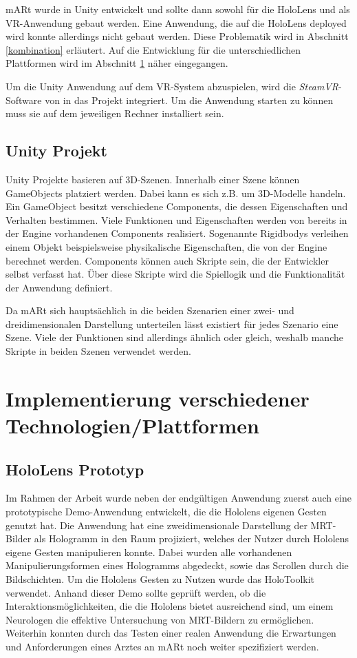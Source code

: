 mARt wurde in Unity entwickelt und sollte dann sowohl für die HoloLens und als VR-Anwendung gebaut werden. Eine Anwendung, die auf die HoloLens deployed wird konnte allerdings nicht gebaut werden. Diese Problematik wird in Abschnitt \ref{kombination} erläutert. Auf die Entwicklung für die unterschiedlichen Plattformen wird im Abschnitt \ref{plattformen} näher eingegangen.

Um die Unity Anwendung auf dem VR-System abzuspielen, wird die \textit{SteamVR}-Software von \citep{steam} in das Projekt integriert. Um die Anwendung starten zu können muss sie auf dem jeweiligen Rechner installiert sein.

\subsection{Unity Projekt}

Unity Projekte basieren auf 3D-Szenen. Innerhalb einer Szene können GameObjects platziert werden. Dabei kann es sich z.B. um 3D-Modelle handeln. Ein GameObject besitzt verschiedene Components, die dessen Eigenschaften und Verhalten bestimmen. Viele Funktionen und Eigenschaften werden von bereits in der Engine vorhandenen Components realisiert. Sogenannte Rigidbodys verleihen einem Objekt beispielsweise physikalische Eigenschaften, die von der Engine berechnet werden. Components können auch Skripte sein, die der Entwickler selbst verfasst hat. Über diese Skripte wird die Spiellogik und die Funktionalität der Anwendung definiert. 

Da mARt sich hauptsächlich in die beiden Szenarien einer zwei- und dreidimensionalen Darstellung unterteilen lässt existiert für jedes Szenario eine Szene.
Viele der Funktionen sind allerdings ähnlich oder gleich, weshalb manche Skripte in beiden Szenen verwendet werden. 


\section{Implementierung verschiedener Technologien/Plattformen}
\label{plattformen}

\subsection{HoloLens Prototyp}
Im Rahmen der Arbeit wurde neben der endgültigen Anwendung zuerst auch eine prototypische Demo-Anwendung entwickelt, die die Hololens eigenen Gesten genutzt hat. Die Anwendung hat eine zweidimensionale Darstellung der MRT-Bilder als Hologramm in den Raum projiziert, welches der Nutzer durch Hololens eigene Gesten manipulieren konnte. Dabei wurden alle vorhandenen Manipulierungsformen eines Hologramms abgedeckt, sowie das Scrollen durch die Bildschichten. Um die Hololens Gesten zu Nutzen wurde das HoloToolkit verwendet. 
Anhand dieser Demo sollte geprüft werden, ob die Interaktionsmöglichkeiten, die die Hololens bietet ausreichend sind, um einem Neurologen die effektive Untersuchung von MRT-Bildern zu ermöglichen.
Weiterhin konnten durch das Testen einer realen Anwendung die Erwartungen und Anforderungen eines Arztes an mARt noch weiter spezifiziert werden.  

